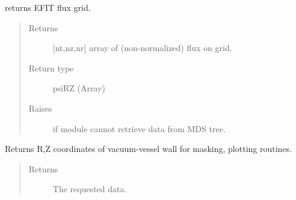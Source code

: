 \documentclass[letterpaper,10pt,english]{sphinxmanual}
\begin{document}
\begin{fulllineitems}
\begin{quote}
\begin{description}
\begin{itemize}
\end{itemize}

\end{description}\end{quote}

\begin{fulllineitems}
\label{\detokenize{eqtools:eqtools.NSTXEFIT.NSTXEFITTree.getFluxGrid}}
returns EFIT flux grid.
\begin{quote}\begin{description}
\item[{Returns}] \leavevmode
{[}nt,nz,nr{]} array of (non-normalized) flux on grid.

\item[{Return type}] \leavevmode
psiRZ (Array)

\item[{Raises}] \leavevmode
{} \textendash{} if module cannot retrieve data from MDS tree.

\end{description}\end{quote}

\end{fulllineitems}


\begin{fulllineitems}
\label{\detokenize{eqtools:eqtools.NSTXEFIT.NSTXEFITTree.getMachineCrossSection}}
Returns R,Z coordinates of vacuum-vessel wall for masking, plotting routines.
\begin{quote}\begin{description}
\item[{Returns}] \leavevmode
The requested data.

\end{description}\end{quote}

\end{fulllineitems}



\end{fulllineitems}
\end{document}
